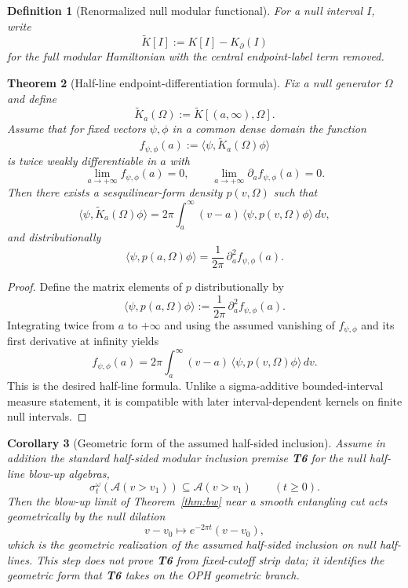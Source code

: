 \documentclass[11pt]{article}
\newtheorem{theorem}{Theorem}[section]
\newtheorem{corollary}[theorem]{Corollary}
\newtheorem{definition}[theorem]{Definition}
\begin{document}
\begin{definition}[Renormalized null modular functional]
For a null interval \(I\), write
\[
\widetilde K[I]
:=
K[I]-K_\partial(I)
\]
for the full modular Hamiltonian with the central endpoint-label term removed.
\end{definition}

\begin{theorem}[Half-line endpoint-differentiation formula]\label{lem:density}
Fix a null generator \(\Omega\) and define
\[
\widetilde K_a(\Omega)
:=
\widetilde K[(a,\infty),\Omega].
\]
Assume that for fixed vectors \(\psi,\phi\) in a common dense domain the function
\[
f_{\psi,\phi}(a)
:=
\langle\psi,\widetilde K_a(\Omega)\phi\rangle
\]
is twice weakly differentiable in \(a\) with
\[
\lim_{a\to+\infty}f_{\psi,\phi}(a)=0,
\qquad
\lim_{a\to+\infty}\partial_a f_{\psi,\phi}(a)=0.
\]
Then there exists a sesquilinear-form density \(p(v,\Omega)\) such that
\[
\langle\psi,\widetilde K_a(\Omega)\phi\rangle
=
2\pi\int_a^\infty (v-a)\,\langle\psi,p(v,\Omega)\phi\rangle\,dv,
\]
and distributionally
\[
\langle\psi,p(a,\Omega)\phi\rangle
=
\frac{1}{2\pi}\,\partial_a^2 f_{\psi,\phi}(a).
\]
\end{theorem}

\begin{proof}
Define the matrix elements of \(p\) distributionally by
\[
\langle\psi,p(a,\Omega)\phi\rangle
:=
\frac{1}{2\pi}\,\partial_a^2 f_{\psi,\phi}(a).
\]
Integrating twice from \(a\) to \(+\infty\) and using the assumed vanishing of \(f_{\psi,\phi}\) and its first derivative at infinity yields
\[
f_{\psi,\phi}(a)
=
2\pi\int_a^\infty (v-a)\,\langle\psi,p(v,\Omega)\phi\rangle\,dv.
\]
This is the desired half-line formula. Unlike a sigma-additive bounded-interval measure statement, it is compatible with later interval-dependent kernels on finite null intervals.
\end{proof}

\begin{corollary}[Geometric form of the assumed half-sided inclusion]\label{cor:n2}
Assume in addition the standard half-sided modular inclusion premise \textbf{T6} for the null half-line blow-up algebras,
\[
\sigma_t^\omega(\mathcal A(v>v_1))
\subseteq
\mathcal A(v>v_1)
\qquad
(t\ge 0).
\]
Then the blow-up limit of Theorem~\ref{thm:bw} near a smooth entangling cut acts geometrically by the null dilation
\[
v-v_0 \mapsto e^{-2\pi t}(v-v_0),
\]
which is the geometric realization of the assumed half-sided inclusion on null half-lines. This step does not prove \textbf{T6} from fixed-cutoff strip data; it identifies the geometric form that \textbf{T6} takes on the OPH geometric branch.
\end{corollary}
\end{document}
